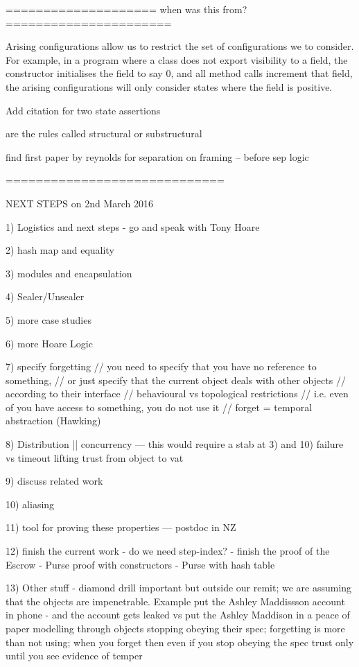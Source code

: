==================== when was this from? ======================

Arising configurations allow us to restrict the set of configurations we to consider. For example, in a program where a class does not export visibility to a field, the constructor initialises the field to say $0$, and all method calls increment that field, the arising configurations will only consider states where the field is positive.

Add citation for two state assertions

are the rules called structural or substructural

find first paper by reynolds for separation on framing --  before sep logic

=============================

NEXT STEPS on 2nd March 2016

1) Logistics and next steps
          - go and speak with Tony Hoare

2) hash map and equality

3) modules and encapsulation

4) Sealer/Unsealer

5) more case studies

6) more Hoare Logic

7) specify forgetting 
      // you need to specify that you have no reference to something,
      // or just specify that the current object deals with other objects
      //         according to their interface
      // behavioural vs topological restrictions
      //         i.e. even of you have access to something, you do not use it
      // forget = temporal abstraction (Hawking)

8) Distribution || concurrency — this would require a stab at 3) and 10)
   failure vs timeout
   lifting trust from object to vat

9) discuss related work

10) aliasing

11) tool for proving these properties — postdoc in NZ

12) finish the current work
	- do we need step-index?
	- finish the proof of the Escrow
	- Purse proof with constructors
	- Purse with hash table

13) Other stuff
	- diamond drill important but outside our remit; we are assuming that 
           the objects are impenetrable. 
        Example
		put the Ashley Maddissson account in phone - and the account gets leaked
			vs
		put the Ashley Maddison in a peace of paper
        modelling through objects stopping obeying their spec; 
        forgetting is more than not using; when you forget then even 
            if you stop obeying the spec
        trust only until you see evidence of temper

